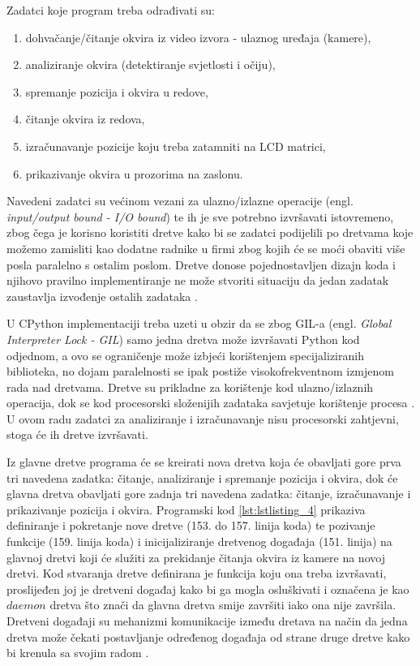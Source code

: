 \documentclass{foi}
\begin{document}
\flushleft Zadatci koje program treba odrađivati su:
\begin{enumerate}[noitemsep]
    \item dohvačanje/čitanje okvira iz video izvora - ulaznog uređaja (kamere),
    \item analiziranje okvira (detektiranje svjetlosti i očiju),
    \item spremanje pozicija i okvira u redove,
    \item čitanje okvira iz redova,
    \item izračunavanje pozicije koju treba zatamniti na LCD matrici,
    \item prikazivanje okvira u prozorima na zaslonu.
\end{enumerate}

\justifying

Navedeni zadatci su većinom vezani za ulazno/izlazne operacije (engl. \emph{input/output bound - I/O bound}) te ih je sve potrebno izvršavati istovremeno, zbog čega je korisno koristiti dretve kako bi se zadatci podijelili po dretvama koje možemo zamisliti kao dodatne radnike u firmi zbog kojih će se moći obaviti više posla paralelno s ostalim poslom. Dretve donose pojednostavljen dizajn koda i njihovo pravilno implementiranje ne može stvoriti situaciju da jedan zadatak zaustavlja izvođenje ostalih zadataka \cite{AndersonJim}.

U CPython implementaciji treba uzeti u obzir da se zbog GIL-a (engl. \emph{Global Interpreter Lock - GIL}) samo jedna dretva može izvršavati Python kod odjednom, a ovo se ograničenje može izbjeći korištenjem specijaliziranih biblioteka, no dojam paralelnosti se ipak postiže visokofrekventnom izmjenom rada nad dretvama. Dretve su prikladne za korištenje kod ulazno/izlaznih operacija, dok se kod procesorski složenijih zadataka savjetuje korištenje procesa \cite{PythonSoftwareFoundation2}. U ovom radu zadatci za analiziranje i izračunavanje nisu procesorski zahtjevni, stoga će ih dretve izvršavati.

Iz glavne dretve programa će se kreirati nova dretva koja će obavljati gore prva tri navedena zadatka: čitanje, analiziranje i spremanje pozicija i okvira, dok će glavna dretva obavljati gore zadnja tri navedena zadatka: čitanje, izračunavanje i prikazivanje pozicija i okvira. Programski kod \ref{lst:lstlisting_4} prikaziva definiranje i pokretanje nove dretve (153. do 157. linija koda) te pozivanje funkcije (159. linija koda) i inicijaliziranje dretvenog događaja (151. linija) na glavnoj dretvi koji će služiti za prekidanje čitanja okvira iz kamere na novoj dretvi. Kod stvaranja dretve definirana je funkcija koju ona treba izvršavati, proslijeđen joj je dretveni događaj kako bi ga mogla osluškivati i označena je kao $daemon$ dretva što znači da glavna dretva smije završiti iako ona nije završila. Dretveni događaji su mehanizmi komunikacije između dretava na način da jedna dretva može čekati postavljanje određenog događaja od strane druge dretve kako bi krenula sa svojim radom \cite{PythonSoftwareFoundation2}.
\end{document}
